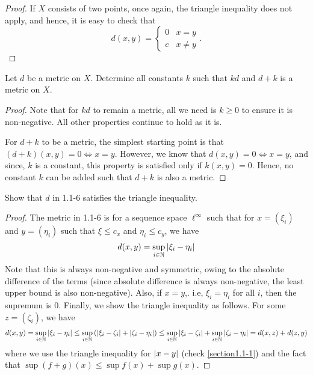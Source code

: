 {\begin{proof}
    If $X$ consists of two points, once again, the triangle inequality does not apply, and hence, it is easy to check that 
    \[d(x,y) = 
    \begin{cases}
        0 & x = y
        \\
        c & x \neq y
    \end{cases}.\]
\end{proof}

\begin{question}
    Let $d$ be a metric on $X$. Determine all constants $k$ such that $kd$ and $d + k$ is a metric on $X$.
    \label{section1.1-5}
\end{question}
\begin{proof}
    Note that for $kd$ to remain a metric, all we need is $k \geq 0$ to ensure it is non-negative. All other properties continue to hold as it is.

    For $d + k$ to be a metric, the simplest starting point is that $(d+k)(x,y) = 0 \iff x = y$. However, we know that $d(x,y) = 0 \iff x = y$, and since, $k$ is a constant, this property is satisfied only if $k(x,y) = 0$. Hence, no constant $k$ can be added such that $d + k$ is also a metric. 
\end{proof}

\begin{question}
    Show that $d$ in 1.1-6 satisfies the triangle inequality.
    \label{section1.1-6}
\end{question}
\begin{proof}
    The metric in 1.1-6 is for a sequence space $\ell^\infty$ such that for $x = (\xi_i)$ and $y = (\eta_i)$ such that $\xi \leq c_x$ and $\eta_i \leq c_y$, we have
    \[d(x,y) = \sup\limits_{i \in \mathbb{N}} \left\lvert \xi_i -\eta_i \right\rvert\]
    Note that this is always non-negative and symmetric, owing to the absolute difference of the terms (since absolute difference is always non-negative, the least upper bound is also non-negative). Also, if $x = y$,. i.e, $\xi_i = \eta_i$ for all $i$, then the supremum is $0$. Finally, we show the triangle inequality as follows. For some $z = (\zeta_i)$, we have
    \[d(x,y) = \sup_{i \in \mathbb{N}} \left\lvert \xi_i - \eta_i \right\rvert \leq \sup_{i \in \mathbb{N}} \left( \left\lvert \xi_i - \zeta_i \right\rvert + \left\lvert \zeta_i - \eta_i \right\rvert \right) \leq \sup_{i \in \mathbb{N}} \left\lvert \xi_i - \zeta_i \right\rvert + \sup_{i \in \mathbb{N}} \left\lvert \zeta_i - \eta_i \right\rvert = d(x,z) + d(z,y)\]
    where we use the triangle inequality for $\left\lvert x-y \right\rvert$ (check \ref{section1.1-1}) and the fact that $\sup (f+g)(x) \leq \sup f(x) + \sup g(x)$.
\end{proof}

}
